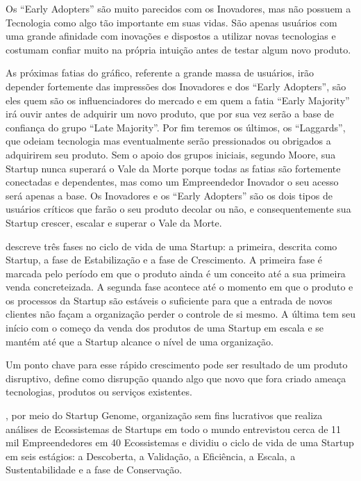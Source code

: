 Os ``Early Adopters'' são muito parecidos com os Inovadores, mas não possuem a Tecnologia como algo tão importante em suas vidas. São apenas usuários com uma grande afinidade com inovações e dispostos a utilizar novas tecnologias e costumam confiar muito na própria intuição antes de testar algum novo produto. 

As próximas fatias do gráfico, referente a grande massa de usuários, irão depender fortemente das impressões dos Inovadores e dos ``Early Adopters'', são eles quem são os influenciadores do mercado e em quem a fatia ``Early Majority'' irá ouvir antes de adquirir um novo produto, que por sua vez serão a base de confiança do grupo ``Late Majority''. Por fim teremos os últimos, os ``Laggards'', que odeiam tecnologia mas eventualmente serão pressionados ou obrigados a adquirirem seu produto. Sem o apoio dos grupos iniciais, segundo Moore, sua Startup nunca superará o Vale da Morte porque todas as fatias são fortemente conectadas e dependentes, mas como um Empreendedor Inovador o seu acesso será apenas a base. Os Inovadores e os ``Early Adopters'' são os dois tipos de usuários críticos que farão o seu produto decolar ou não, e consequentemente sua Startup crescer, escalar e superar o Vale da Morte.

 descreve três fases no ciclo de vida de uma Startup: a primeira, descrita como Startup, a fase de Estabilização e a fase de Crescimento.  A primeira fase é marcada pelo período em que o produto ainda é um conceito até a sua primeira venda concreteizada. A segunda fase acontece até o momento em que o produto e os processos da Startup são estáveis o suficiente para que a entrada de novos clientes não façam a organização perder o controle de si mesmo. A última tem seu início com o começo da venda dos produtos de uma Startup em escala e se mantém até que a Startup alcance o nível de uma organização.

Um ponto chave para esse rápido crescimento pode ser resultado de um produto disruptivo,  define como disrupção quando algo que novo que fora criado ameaça tecnologias, produtos ou serviços existentes. 

, por meio do Startup Genome, organização sem fins lucrativos que realiza análises de Ecossistemas de Startups em todo o mundo entrevistou cerca de 11 mil Empreendedores em 40 Ecossistemas e dividiu o ciclo de vida de uma Startup em seis estágios: a Descoberta, a Validação, a Eficiência, a Escala, a Sustentabilidade e a fase de Conservação. 

